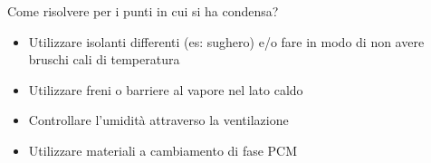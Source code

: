 \documentclass[aspectratio=141,10pt]{beamer}
\begin{document}
\begin{frame}
    Come risolvere per i punti in cui si ha condensa?
    \begin{itemize}
        \item Utilizzare isolanti differenti (es: sughero) e/o fare in modo di non avere bruschi cali di temperatura
        \item Utilizzare freni o barriere al vapore nel lato caldo 
        \item Controllare l'umidità attraverso la ventilazione
        \item Utilizzare materiali a cambiamento di fase PCM
    \end{itemize}
\end{frame}


\end{document}
